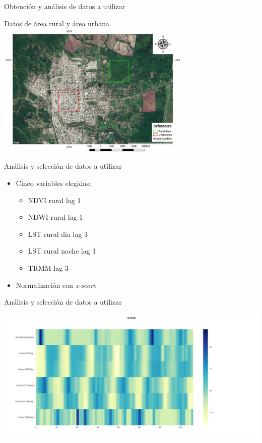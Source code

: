 \documentclass[10pt]{beamer}
\begin{document}
\begin{frame}{Obtención y análisis de datos a utilizar}
  \begin{center}
    Datos de área rural y área urbana
    \includegraphics[width=0.7\textwidth]{zones}
  \end{center}
\end{frame}


\begin{frame}{Análisis y selección de datos a utilizar}
\begin{itemize}
  \item Cinco variables elegidas:
    \begin{itemize}
      \item NDVI rural lag 1
      \item NDWI rural lag 1
      \item LST rural dia lag 3
      \item LST rural noche lag 1
      \item TRMM lag 3
    \end{itemize}
    \item Normalización con \textit{z-score}
\end{itemize}
\end{frame}

\begin{frame}{Análisis y selección de datos a utilizar}
  \begin{center}
    \includegraphics[width=1.22\textwidth]{heatmap}
  \end{center}
\end{frame}
\end{document}
